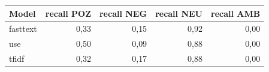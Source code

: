\begin{tabular}{lrrrr}
\toprule
Model & recall POZ & recall NEG & recall NEU & recall AMB \\
\midrule
fasttext & 0{,}33 & 0{,}15 & 0{,}92 & 0{,}00 \\
use & 0{,}50 & 0{,}09 & 0{,}88 & 0{,}00 \\
tfidf & 0{,}32 & 0{,}17 & 0{,}88 & 0{,}00 \\
\bottomrule
\end{tabular}
